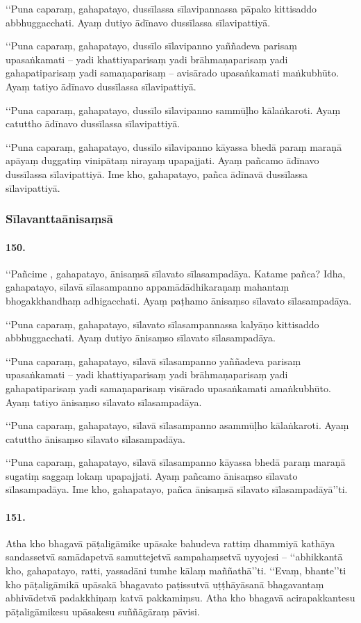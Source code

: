 ‘‘Puna caparaṃ, gahapatayo, dussīlassa sīlavipannassa pāpako kittisaddo abbhuggacchati. Ayaṃ dutiyo ādīnavo dussīlassa sīlavipattiyā.

‘‘Puna caparaṃ, gahapatayo, dussīlo sīlavipanno yaññadeva parisaṃ upasaṅkamati – yadi khattiyaparisaṃ yadi brāhmaṇaparisaṃ yadi gahapatiparisaṃ yadi samaṇaparisaṃ – avisārado upasaṅkamati maṅkubhūto. Ayaṃ tatiyo ādīnavo dussīlassa sīlavipattiyā.

‘‘Puna caparaṃ, gahapatayo, dussīlo sīlavipanno sammūḷho kālaṅkaroti. Ayaṃ catuttho ādīnavo dussīlassa sīlavipattiyā.

‘‘Puna caparaṃ, gahapatayo, dussīlo sīlavipanno kāyassa bhedā paraṃ maraṇā apāyaṃ duggatiṃ vinipātaṃ nirayaṃ upapajjati. Ayaṃ pañcamo ādīnavo dussīlassa sīlavipattiyā. Ime kho, gahapatayo, pañca ādīnavā dussīlassa sīlavipattiyā.

\subsubsection{Sīlavanttaānisaṃsā}

\paragraph{150.} ‘‘Pañcime , gahapatayo, ānisaṃsā sīlavato sīlasampadāya. Katame pañca? Idha, gahapatayo, sīlavā sīlasampanno appamādādhikaraṇaṃ mahantaṃ bhogakkhandhaṃ adhigacchati. Ayaṃ paṭhamo ānisaṃso sīlavato sīlasampadāya.

‘‘Puna caparaṃ, gahapatayo, sīlavato sīlasampannassa kalyāṇo kittisaddo abbhuggacchati. Ayaṃ dutiyo ānisaṃso sīlavato sīlasampadāya.

‘‘Puna caparaṃ, gahapatayo, sīlavā sīlasampanno yaññadeva parisaṃ upasaṅkamati – yadi khattiyaparisaṃ yadi brāhmaṇaparisaṃ yadi gahapatiparisaṃ yadi samaṇaparisaṃ visārado upasaṅkamati amaṅkubhūto. Ayaṃ tatiyo ānisaṃso sīlavato sīlasampadāya.

‘‘Puna caparaṃ, gahapatayo, sīlavā sīlasampanno asammūḷho kālaṅkaroti. Ayaṃ catuttho ānisaṃso sīlavato sīlasampadāya.

‘‘Puna caparaṃ, gahapatayo, sīlavā sīlasampanno kāyassa bhedā paraṃ maraṇā sugatiṃ saggaṃ lokaṃ upapajjati. Ayaṃ pañcamo ānisaṃso sīlavato sīlasampadāya. Ime kho, gahapatayo, pañca ānisaṃsā sīlavato sīlasampadāyā’’ti.

\paragraph{151.} Atha kho bhagavā pāṭaligāmike upāsake bahudeva rattiṃ dhammiyā kathāya sandassetvā samādapetvā samuttejetvā sampahaṃsetvā uyyojesi – ‘‘abhikkantā kho, gahapatayo, ratti, yassadāni tumhe kālaṃ maññathā’’ti. ‘‘Evaṃ, bhante’’ti kho pāṭaligāmikā upāsakā bhagavato paṭissutvā uṭṭhāyāsanā bhagavantaṃ abhivādetvā padakkhiṇaṃ katvā pakkamiṃsu. Atha kho bhagavā acirapakkantesu pāṭaligāmikesu upāsakesu suññāgāraṃ pāvisi.

